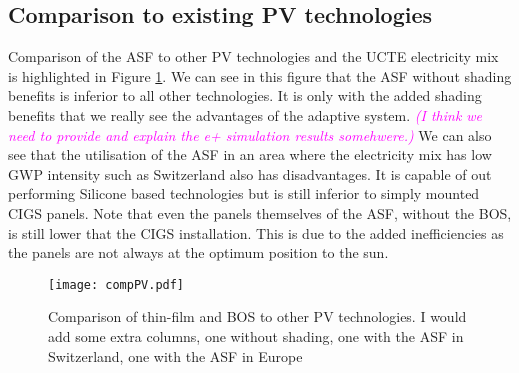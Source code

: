 



\subsection{Comparison to existing PV technologies}

Comparison of the ASF to other PV technologies and the UCTE electricity mix is highlighted in Figure \ref{fig:compPV}. We can see in this figure that the ASF without shading benefits is inferior to all other technologies. It is only with the added shading benefits that we really see the advantages of the adaptive system. \textcolor{magenta}{\textit{(I think we need to provide and explain the e+ simulation results somehwere.)}}
We can also see that the utilisation of the ASF in an area where the electricity mix has low GWP intensity such as Switzerland also has disadvantages. It is capable of out performing Silicone based technologies but is still inferior to simply mounted CIGS panels. Note that even the panels themselves of the ASF, without the BOS, is still lower that the CIGS installation. This is due to the added inefficiencies as the panels are not always at the optimum position to the sun.


\begin{figure}[H]
\begin{center}
\texttt{[image: compPV.pdf]}
\caption{Comparison of thin-film and BOS to other PV technologies. I would add some extra columns, one without shading, one with the ASF in Switzerland, one with the ASF in Europe}
\label{fig:compPV}
\end{center}
\end{figure}




